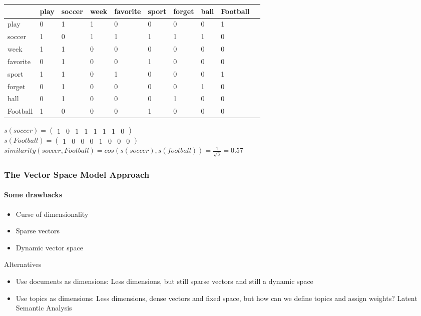 \documentclass{beamer}
\begin{document}
\begin{frame}
\begin{center}
\small 
\begin{tabular}{|l|l|l|l|l|l|l|l|l|l|}
\hline
~        & play & soccer & week & favorite & sport & forget & ball & Football \\ \hline
play     & 0    & 1      & 1    & 0        & 0     & 0      & 0    & 1        \\ \hline
\rowcolor{LightCyan}
soccer   & 1    & 0      & 1    & 1        & 1     & 1      & 1    & 0        \\ \hline
week     & 1    & 1      & 0    & 0        & 0     & 0      & 0    & 0        \\ \hline
favorite & 0    & 1      & 0    & 0        & 1     & 0      & 0    & 0        \\ \hline
sport    & 1    & 1      & 0    & 1        & 0     & 0      & 0    & 1        \\ \hline
forget   & 0    & 1      & 0    & 0        & 0     & 0      & 1    & 0        \\ \hline
ball     & 0    & 1      & 0    & 0        & 0     & 1      & 0    & 0        \\ \hline
\rowcolor{LightCyan}
Football & 1    & 0      & 0    & 0        & 1     & 0      & 0    & 0        \\ \hline
\end{tabular}

\end{center}
$s(soccer) = \begin{pmatrix} 1 & 0 & 1 & 1 & 1 & 1 & 1 & 0\end{pmatrix} $\\
\medskip
$s(Football) = \begin{pmatrix} 1 & 0 & 0 & 0 & 1 & 0 & 0 & 0 \end{pmatrix} $\\
\medskip
$similarity(soccer, Football)=cos(s(soccer), s(football)) = \frac{1}{\sqrt 3} = 0.57$
\end{frame}

\begin{frame}
	\frametitle{The Vector Space Model Approach}
	\framesubtitle{Some drawbacks}
  \begin{itemize}
    \item	Curse of dimensionality
    \item	Sparse vectors
    \item	Dynamic vector space
      \end{itemize}
      \bigskip
      Alternatives
  \begin{itemize}
    \item	Use documents as dimensions: Less dimensions, but still sparse vectors and still a dynamic space
    \item	Use topics as dimensions: Less dimensions, dense vectors and fixed space, but how can we define topics and assign weights?  Latent Semantic Analysis
  \end{itemize}
\end{frame}
\end{document}

